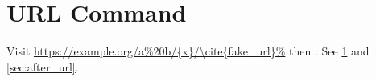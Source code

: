\documentclass{article}
\begin{document}
\section{URL Command}\label{sec:url_cmd}
Visit \url{https://example.org/a%20b/{x}/\cite{fake_url}%} then \cite{k1} \label{sec:after_url}.
See \ref{sec:url_cmd} and \ref{sec:after_url}.


\end{document}
